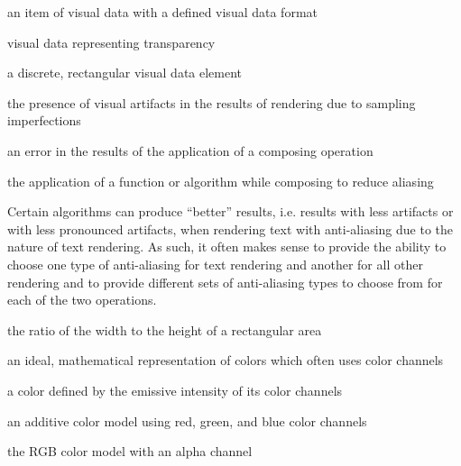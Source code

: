 an item of visual data with a defined visual data format

visual data representing transparency

a discrete, rectangular visual data element

the presence of visual artifacts in the results of rendering due to 
sampling imperfections

an error in the results of the application of a composing operation 

the application of a function or algorithm while composing to 
reduce aliasing
\begin{note}
Certain algorithms can produce ``better'' results, i.e. results with less 
artifacts or with less pronounced artifacts, when rendering text with 
anti-aliasing due to the nature of text rendering. As such, it often makes 
sense to provide the ability to choose one type of anti-aliasing for text 
rendering and another for all other rendering and to provide different sets of 
anti-aliasing types to choose from for each of the two operations.
\end{note}

the ratio of the width to the height of a rectangular area

an ideal, mathematical representation of colors which often uses color channels

a color defined by the emissive intensity of its color channels

an additive color model using red, green, and blue color channels

the RGB color model with an alpha channel


